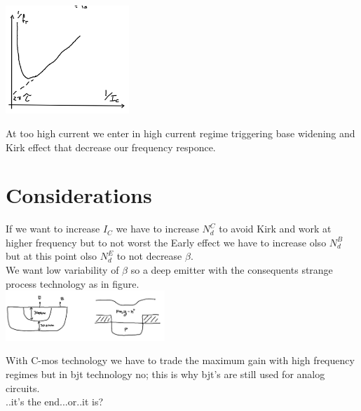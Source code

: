 \centering
\includegraphics[width=0.35\textwidth]{bjt14.png}\\
\raggedright

At too high current we enter in high current regime triggering base widening and Kirk effect that decrease our frequency responce.\\

\section{Considerations}
If we want to increase $I_C$ we have to increase $N_d^C$ to avoid Kirk and work at higher frequency but to not worst the Early effect we have to increase olso $N_d^B$ but at this point olso $N_d^E$ to not decrease $\beta$.\\
\vspace{5mm}
We want low variability of $\beta$ so a deep emitter with the consequents strange process technology as in figure.\\

\centering
\includegraphics[width=0.45\textwidth]{bjtfinal.png}\\
\raggedright

\vspace{5mm}
With C-mos technology we have to trade the maximum gain with high frequency regimes but in bjt technology no; this is why bjt's are still used for analog circuits.\\
\vspace{150mm}
..it's the end...or..it is?

